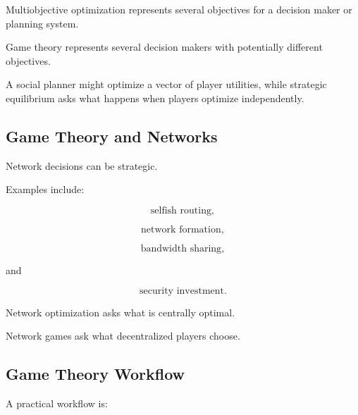 Multiobjective optimization represents several objectives for a decision
maker or planning system.

Game theory represents several decision makers with potentially different
objectives.

A social planner might optimize a vector of player utilities, while
strategic equilibrium asks what happens when players optimize
independently.

\subsection{Game Theory and Networks}
\label{subsec:game-theory-networks}

Network decisions can be strategic.

Examples include:

\[
\boxed{
\text{selfish routing},
}
\]

\[
\boxed{
\text{network formation},
}
\]

\[
\boxed{
\text{bandwidth sharing},
}
\]

and

\[
\boxed{
\text{security investment}.
}
\]

Network optimization asks what is centrally optimal.

Network games ask what decentralized players choose.

\subsection{Game Theory Workflow}
\label{subsec:game-theory-workflow}

A practical workflow is:


